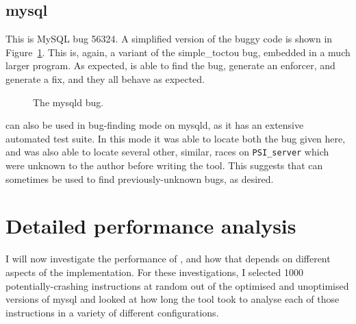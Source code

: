 \subsection{mysql}

This is MySQL bug 56324\needCite{}.  A simplified version of the buggy
code is shown in Figure~\ref{fig:eval:mysqld}.  This is, again, a
variant of the simple\_toctou bug, embedded in a much larger program.
As expected, {\implementation} is able to find the bug, generate an
enforcer, and generate a fix, and they all behave as expected.

\begin{figure}
  \caption{The mysqld bug.}
  \label{fig:eval:mysqld}
\end{figure}

{\Implementation} can also be used in bug-finding mode on mysqld, as
it has an extensive automated test suite.  In this mode it was able to
locate both the bug given here, and was also able to locate several
other, similar, races on \texttt{PSI\_server} which were unknown to
the author before writing the tool.  This suggests that
{\implementation} can sometimes be used to find previously-unknown
bugs, as desired.


\section{Detailed performance analysis}
\label{sect:eval:time_details}

I will now investigate the performance of {\implementation}, and how
that depends on different aspects of the implementation.  For these
investigations, I selected 1000 potentially-crashing instructions at
random out of the optimised and unoptimised versions of mysql and
looked at how long the tool took to analyse each of those instructions
in a variety of different configurations.

